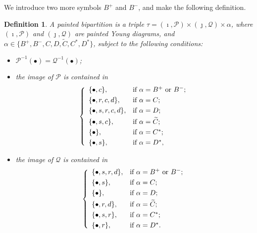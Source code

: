 \documentclass[12pt,a4paper]{amsart}
\newcommand{\CP}{{\mathcal {P}}}
\newcommand{\CQ}{{\mathcal {Q}}}
\numberwithin{equation}{section}
\newtheorem{defn}[thm]{Definition}
\theoremstyle{remark}
\begin{document}
 We introduce two more symbols $B^+$ and $B^-$, and make the following definition.
 \begin{defn}\label{defpbp0}
 A painted bipartition is a triple $\tau=(\imath, \CP)\times (\jmath, \CQ)\times \alpha$, where $(\imath, \CP)$ and $ (\jmath, \CQ)$ are painted Young diagrams, and $\alpha\in \{B^+,B^-, C,D,\widetilde {C}, C^*, D^*\}$, subject to the following conditions:
 \begin{itemize}

 \item
 $\CP^{-1}(\bullet)=\CQ^{-1}(\bullet)$;
 \item
 the image of $\CP$ is contained in
 \[
 \left\{
     \begin{array}{ll}
         \{\bullet, c\}, &\hbox{if $\alpha=B^+$ or $B^-$}; \smallskip\\
            \{\bullet,  r, c,d\}, &\hbox{if $\alpha=C$}; \smallskip\\
          \{\bullet, s, r, c,d\}, &\hbox{if $\alpha=D$}; \smallskip\\
            \{\bullet, s, c\}, &\hbox{if $\alpha=\widetilde{ C}$}; \smallskip \\
        \{\bullet\}, &\hbox{if $\alpha=C^*$}; \smallskip \\
          \{\bullet, s\}, &\hbox{if $\alpha=D^*$},\\
            \end{array}
   \right.
 \]
 \item
 the image of $\CQ$ is contained in
 \[
 \left\{
     \begin{array}{ll}
         \{\bullet, s, r, d\}, &\hbox{if $\alpha=B^+$ or $B^-$}; \smallskip\\
           \{\bullet, s\}, &\hbox{if $\alpha=C$}; \smallskip\\
           \{\bullet\}, &\hbox{if $\alpha=D$}; \smallskip\\
             \{\bullet, r, d\}, &\hbox{if $\alpha=\widetilde{ C}$}; \smallskip\\
        \{\bullet, s,r\}, &\hbox{if $\alpha=C^*$}; \smallskip \\
          \{\bullet, r\}, &\hbox{if $\alpha=D^*$}.
            \end{array}
   \right.
 \]

 \end{itemize}
 \end{defn}
\end{document}
